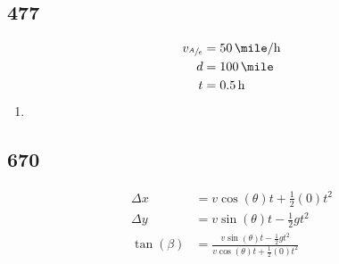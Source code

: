 \documentclass{article}
\begin{document}
\subsection{477}
\begin{align*}
	v_{\sfrac{A}{e}} & = \SI{50}{\mile \per \hour} \\
	d & = \SI{100}{\mile} \\
	t & = \SI{0.5}{\hour}
\end{align*}
\begin{enumerate}[label=\textbf{(\alph*)}]
	\item
\end{enumerate}

\subsection{670}
\begin{align*}
	\Delta x & = v\cos(\theta)t + \frac{1}{2}(0)t^2 \\
	\Delta y & = v\sin(\theta)t - \frac{1}{2}gt^2 \\
	\tan(\beta) & = \frac{ v\sin(\theta)t - \frac{1}{2}gt^2 }{ v\cos(\theta)t + \frac{1}{2}(0)t^2 } \\
\end{align*}
\end{document}
